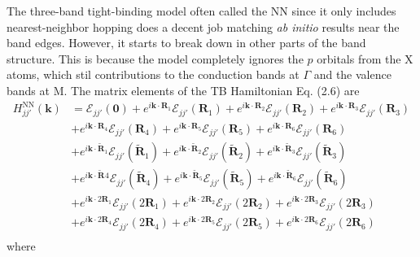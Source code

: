 \documentclass{report}
\begin{document}
The three-band tight-binding model often called the \ac{NN} since it only includes nearest-neighbor hopping does a decent job matching \textit{ab initio} results near the band edges. However, it starts to break down in other parts of the band structure. This is because the model completely ignores the $p$ orbitals from the X atoms, which stil contributions to the conduction bands at $\Gamma$ and the valence bands at M. The matrix elements of the \ac{TB} Hamiltonian Eq. (2.6) are
\begin{equation}
	\begin{aligned}
		H_{jj'}^{\text{NN}}(\mathbf{k})
		 & = \mathcal{E}_{jj'}(\mathbf{0}) + e^{i\mathbf{k}\cdot \mathbf{R}_{1}}\mathcal{E}_{jj'}(\mathbf{R}_{1}) + e^{i\mathbf{k}\cdot \mathbf{R}_{2}}\mathcal{E}_{jj'}(\mathbf{R}_{2}) + e^{i\mathbf{k}\cdot \mathbf{R}_{3}}\mathcal{E}_{jj'}(\mathbf{R}_{3})                 \\
		 & + e^{i\mathbf{k}\cdot \mathbf{R}_{4}}\mathcal{E}_{jj'}(\mathbf{R}_{4}) + e^{i\mathbf{k}\cdot \mathbf{R}_{5}}\mathcal{E}_{jj'}(\mathbf{R}_{5}) + e^{i\mathbf{k}\cdot \mathbf{R}_{6}}\mathcal{E}_{jj'}(\mathbf{R}_{6})                                                 \\
		 & + e^{i\mathbf{k}\cdot \tilde{\mathbf{R}}_{1}}\mathcal{E}_{jj'}(\tilde{\mathbf{R}}_{1}) + e^{i\mathbf{k}\cdot \tilde{\mathbf{R}}_{2}}\mathcal{E}_{jj'}(\tilde{\mathbf{R}}_{2}) + e^{i\mathbf{k}\cdot \tilde{\mathbf{R}}_{3}}\mathcal{E}_{jj'}(\tilde{\mathbf{R}}_{3}) \\
		 & + e^{i\mathbf{k}\cdot \tilde{\mathbf{R}}_{}4}\mathcal{E}_{jj'}(\tilde{\mathbf{R}}_{4}) + e^{i\mathbf{k}\cdot \tilde{\mathbf{R}}_{5}}\mathcal{E}_{jj'}(\tilde{\mathbf{R}}_{5}) + e^{i\mathbf{k}\cdot \tilde{\mathbf{R}}_{6}}\mathcal{E}_{jj'}(\tilde{\mathbf{R}}_{6}) \\
		 & + e^{i\mathbf{k}\cdot 2\mathbf{R}_{1}}\mathcal{E}_{jj'}(2\mathbf{R}_{1}) + e^{i\mathbf{k}\cdot 2\mathbf{R}_{2}}\mathcal{E}_{jj'}(2\mathbf{R}_{2}) + e^{i\mathbf{k}\cdot 2\mathbf{R}_{3}}\mathcal{E}_{jj'}(2\mathbf{R}_{3})                                           \\
		 & + e^{i\mathbf{k}\cdot 2\mathbf{R}_{4}}\mathcal{E}_{jj'}(2\mathbf{R}_{4}) + e^{i\mathbf{k}\cdot 2\mathbf{R}_{5}}\mathcal{E}_{jj'}(2\mathbf{R}_{5}) + e^{i\mathbf{k}\cdot 2\mathbf{R}_{6}}\mathcal{E}_{jj'}(2\mathbf{R}_{6})                                           \\
	\end{aligned}
\end{equation}
where
\end{document}
